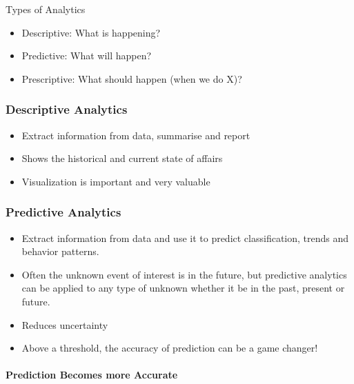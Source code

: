 \documentclass[
]{article}
\providecommand{\tightlist}{%
  \setlength{\itemsep}{0pt}\setlength{\parskip}{0pt}}
\begin{document}
Types of Analytics

\begin{itemize}
\tightlist
\item
  Descriptive: What is happening?
\item
  Predictive: What will happen?
\item
  Prescriptive: What should happen (when we do X)?
\end{itemize}

\hypertarget{descriptive-analytics}{%
\subsubsection{Descriptive Analytics}\label{descriptive-analytics}}

\begin{itemize}
\tightlist
\item
  Extract information from data, summarise and report
\item
  Shows the historical and current state of affairs
\item
  Visualization is important and very valuable
\end{itemize}

\hypertarget{predictive-analytics}{%
\subsubsection{Predictive Analytics}\label{predictive-analytics}}

\begin{itemize}
\tightlist
\item
  Extract information from data and use it to predict classification, trends and behavior patterns.
\item
  Often the unknown event of interest is in the future, but predictive analytics can be applied to any type of unknown whether it be in the past, present or future.
\item
  Reduces uncertainty
\item
  Above a threshold, the accuracy of prediction can be a game changer!
\end{itemize}

\hypertarget{prediction-becomes-more-accurate}{%
\paragraph{Prediction Becomes more Accurate}\label{prediction-becomes-more-accurate}}
\end{document}
